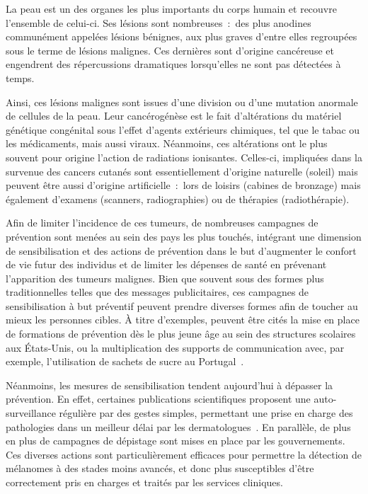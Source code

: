 \renewcommand{\thechapter}{\roman{chapter}}
\setcounter{chapter}{1}
\setcounter{figure}{0}

\label{chap:introduction}
La peau est un des organes les plus importants du corps humain et recouvre l'ensemble de celui-ci. Ses lésions sont nombreuses~:~des plus anodines communément appelées lésions bénignes, aux plus graves d'entre elles regroupées sous le terme de lésions malignes. Ces dernières sont d'origine cancéreuse et engendrent des répercussions dramatiques lorsqu'elles ne sont pas détectées à temps.\par

Ainsi, ces lésions malignes sont issues d’une division ou d’une mutation anormale de cellules de la peau. Leur cancérogénèse est le fait d'altérations du matériel génétique congénital sous l'effet d'agents extérieurs chimiques, tel que le tabac ou les médicaments, mais aussi viraux. Néanmoins, ces altérations ont le plus souvent pour origine l'action de radiations ionisantes. Celles-ci, impliquées dans la survenue des cancers cutanés sont essentiellement d'origine naturelle (soleil) mais peuvent être aussi d'origine artificielle~:~lors de loisirs (cabines de bronzage) mais également d'examens (scanners, radiographies) ou de thérapies (radiothérapie).\par

Afin de limiter l’incidence de ces tumeurs, de nombreuses campagnes de prévention sont menées au sein des pays les plus touchés, intégrant une dimension de sensibilisation et des actions de prévention dans le but d’augmenter le confort de vie futur des individus et de limiter les dépenses de santé en prévenant l'apparition des tumeurs malignes. Bien que souvent sous des formes plus traditionnelles telles que des messages publicitaires, ces campagnes de sensibilisation à but préventif peuvent prendre diverses formes afin de toucher au mieux les personnes cibles. À titre d’exemples, peuvent être cités la mise en place de formations de prévention dès le plus jeune âge au sein des structures scolaires aux États-Unis, ou la multiplication des supports de communication avec, par exemple, l’utilisation de sachets de sucre au Portugal~\cite{Guy2016,Correia2017}.\par 

Néanmoins, les mesures de sensibilisation tendent aujourd’hui à dépasser la prévention. En effet, certaines publications scientifiques proposent une auto-surveillance régulière par des gestes simples, permettant une prise en charge des pathologies dans un meilleur délai par les dermatologues~\cite{Friedman1985}. En parallèle, de plus en plus de campagnes de dépistage sont mises en place par les gouvernements. Ces diverses actions sont particulièrement efficaces pour permettre la détection de mélanomes à des stades moins avancés, et donc plus susceptibles d'être correctement pris en charges et traités par les services cliniques.\par

